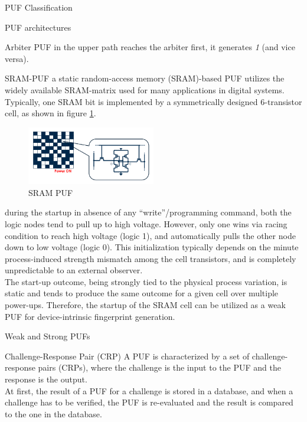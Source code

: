\begin{section}{PUF Classification}
\begin{subsection}{PUF architectures}
\begin{subsubsection}{Arbiter PUF}
    in the upper path reaches the arbiter first, it generates \textit{1} (and vice versa).
  \end{subsubsection}
  \begin{subsubsection}{SRAM-PUF}
    a static random-access memory (SRAM)-based PUF utilizes the widely available SRAM-matrix used
    for many applications in digital systems.\\
    Typically, one SRAM bit is implemented by a symmetrically designed 6-transistor cell, as shown
    in figure \ref{fig:sram_puf}.
    \begin{figure}[h]
      \centering
      \includegraphics[width=0.5\textwidth]{img/hardware/sram puf.png}
      \caption{SRAM PUF}
      \label{fig:sram_puf}
    \end{figure}
    during the startup in absence of any “write”/programming command, both the logic nodes tend to
    pull up to high voltage. However, only one wins via racing condition to reach high voltage
    (logic 1), and automatically pulls the other node down to low voltage (logic 0). This
    initialization typically depends on the minute process-induced strength mismatch among the cell
    transistors, and is completely unpredictable to an external observer.\\
    The start-up outcome, being strongly tied to the physical process variation, is static and tends
    to produce the same outcome for a given cell over multiple power-ups. Therefore, the startup of
    the SRAM cell can be utilized as a weak PUF for device-intrinsic fingerprint generation.
  \end{subsubsection}
\end{subsection}
\begin{subsection}{Weak and Strong PUFs}
  \begin{paragraph}{Challenge-Response Pair (CRP)}
    A PUF is characterized by a set of challenge-response pairs (CRPs), where the challenge is the
    input to the PUF and the response is the output.\\
    At first, the result of a PUF for a challenge is stored in a database, and when a challenge has
    to be verified, the PUF is re-evaluated and the result is compared to the one in the database.

\end{paragraph}
\end{subsection}
\end{section}
